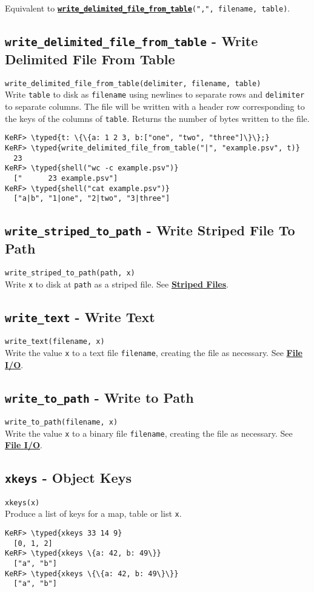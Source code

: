 \documentclass{article}
\newcommand{\typed}[1]{\textcolor{TealBlue}{#1}}
\newcommand{\primdefu}[3]{\subsection{\texttt{#1} - #2}\label{prim:#3}}
\newcommand{\primu}[2]{\hyperref[prim:#2]{\textbf{\texttt{#1}}}}
\newcommand{\primdef}[2]{\primdefu{#1}{#2}{#1}}
\begin{document}
Equivalent to \primu{write\_delimited\_file\_from\_table}{writeDelimitedFileFromTable}\texttt{(",", filename, table)}.

\primdefu{write\_delimited\_file\_from\_table}{Write Delimited File From Table}{writeDelimitedFileFromTable}
\texttt{write\_delimited\_file\_from\_table(delimiter, filename, table)}\\

Write \texttt{table} to disk as \texttt{filename} using newlines to separate rows and \texttt{delimiter} to separate columns. The file will be written with a header row corresponding to the keys of the columns of \texttt{table}. Returns the number of bytes written to the file.

\begin{Verbatim}
KeRF> \typed{t: \{\{a: 1 2 3, b:["one", "two", "three"]\}\};}
KeRF> \typed{write_delimited_file_from_table("|", "example.psv", t)}
  23
KeRF> \typed{shell("wc -c example.psv")}
  ["      23 example.psv"]
KeRF> \typed{shell("cat example.psv")}
  ["a|b", "1|one", "2|two", "3|three"]
\end{Verbatim}

\primdefu{write\_striped\_to\_path}{Write Striped File To Path}{writeStripedToPath}
\texttt{write\_striped\_to\_path(path, x)}\\

Write \texttt{x} to disk at \texttt{path} as a striped file. See \hyperref[sec:stripeio]{\textbf{Striped Files}}.

\primdefu{write\_text}{Write Text}{writeText}
\texttt{write\_text(filename, x)}\\

Write the value \texttt{x} to a text file \texttt{filename}, creating the file as necessary. See \hyperref[sec:fileio]{\textbf{File I/O}}.

\primdefu{write\_to\_path}{Write to Path}{writeToPath}
\texttt{write\_to\_path(filename, x)}\\

Write the value \texttt{x} to a binary file \texttt{filename}, creating the file as necessary. See \hyperref[sec:fileio]{\textbf{File I/O}}.

\pagebreak
\primdef{xkeys}{Object Keys}
\texttt{xkeys(x)}\\

Produce a list of keys for a map, table or list \texttt{x}.
\begin{Verbatim}
KeRF> \typed{xkeys 33 14 9}
  [0, 1, 2]
KeRF> \typed{xkeys \{a: 42, b: 49\}}
  ["a", "b"]
KeRF> \typed{xkeys \{\{a: 42, b: 49\}\}}
  ["a", "b"]
\end{Verbatim}
\end{document}
